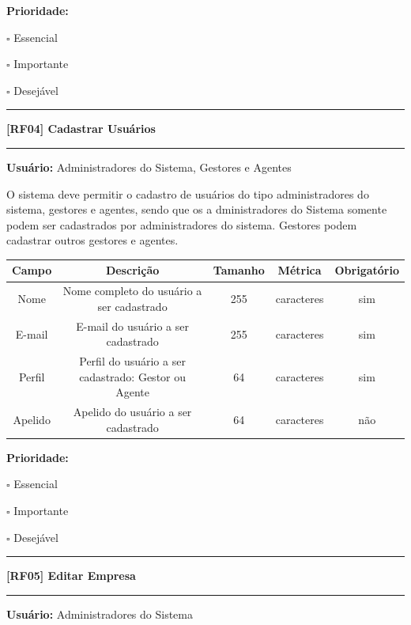 \documentclass{scrreprt}
\begin{document}
	\textbf{Prioridade: }\begin{itemize*}
		\item[\hspace{1cm}\rlap{\raisebox{0.2ex}{\hspace{0.4ex}\scriptsize \ding{56}}}$\square$]
		Essencial
		\item[\hspace{1cm}$\square$]
		Importante
		\item[\hspace{1cm}$\square$]
		Desejável
	\end{itemize*}
	
	\begin{center}
		\noindent\rule{16cm}{0.4pt}
		\textbf{[RF04] Cadastrar Usuários}
		\noindent\rule{16cm}{0.4pt}
	\end{center}
	\textbf{Usuário:} Administradores do Sistema, Gestores e Agentes
	
	O sistema deve permitir o cadastro de usuários do tipo administradores do sistema, gestores e agentes, sendo que os a
	dministradores do Sistema somente podem ser cadastrados por administradores do sistema. Gestores podem cadastrar outros gestores e agentes.
	
	\begin{center}
		\begin{adjustbox}{width=\textwidth}      \begin{tabular}{ |c|c|c|c|c| } 
			\hline
			\rowcolor{lightgray} Campo & Descrição & Tamanho & Métrica & Obrigatório \\
			\hline
			Nome & Nome completo do usuário a ser cadastrado & 255 & caracteres & sim \\ 
			\hline
			E-mail & E-mail do usuário a ser cadastrado & 255 & caracteres & sim \\ 
			\hline
			Perfil & Perfil do usuário a ser cadastrado: Gestor ou Agente & 64 & caracteres & sim \\ 
			\hline
			Apelido & Apelido do usuário a ser cadastrado & 64 & caracteres & não \\
			\hline
		\end{tabular}    \end{adjustbox}
	\end{center}
	
	\textbf{Prioridade: }\begin{itemize*}
		\item[\hspace{1cm}\rlap{\raisebox{0.2ex}{\hspace{0.4ex}\scriptsize \ding{56}}}$\square$]
		Essencial
		\item[\hspace{1cm}$\square$]
		Importante
		\item[\hspace{1cm}$\square$]
		Desejável
	\end{itemize*}
	\begin{center}
		\noindent\rule{16cm}{0.4pt}
		\textbf{[RF05] Editar Empresa}
		\noindent\rule{16cm}{0.4pt}
	\end{center}
	\textbf{Usuário:} Administradores do Sistema
	
\end{document}
